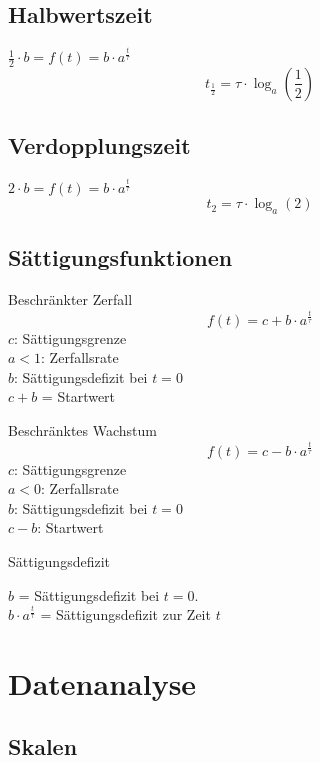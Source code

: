\begin{multicols}{2}
\subsection{Halbwertszeit}
$\frac12 \cdot{} b = f(t) = b\cdot{}a^{\frac{t}{\tau}}$
$$t_{\frac12} = \tau\cdot{}\log_a\left(\frac12\right)$$

\subsection{Verdopplungszeit}
$2\cdot{}b = f(t) = b\cdot{}a^{\frac{t}{\tau}}$
$$t_{2} = \tau\cdot{}\log_a(2)$$

\subsection{Sättigungsfunktionen}
\begin{gesetz}{Beschränkter Zerfall}{}
$$f(t) = c + b\cdot{}a^\frac{t}\tau$$
$c$: Sättigungsgrenze\\
$a<1$: Zerfallsrate\\
$b$: Sättigungsdefizit bei $t=0$\\
$c+b$ = Startwert 
\end{gesetz}

\begin{gesetz}{Beschränktes Wachstum}{}
$$f(t) = c - b\cdot{}a^\frac{t}\tau$$
$c$: Sättigungsgrenze\\
$a<0$: Zerfallsrate\\
$b$: Sättigungsdefizit bei $t=0$\\
$c-b$: Startwert
\end{gesetz}

\begin{bemerkung}{Sättigungsdefizit}{}

$b$ = Sättigungsdefizit bei $t=0$.\\
$b\cdot{}a^\frac{t}\tau$ = Sättigungsdefizit zur Zeit $t$
\end{bemerkung}

\end{multicols}

\hrulefill
\section{Datenanalyse}

\subsection{Skalen}
\vspace{5mm}



